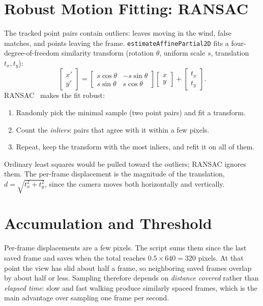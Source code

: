 \documentclass[11pt]{article}
\begin{document}
\section{Robust Motion Fitting: RANSAC}
The tracked point pairs contain outliers: leaves moving in the wind, false
matches, and points leaving the frame. \texttt{estimateAffinePartial2D} fits a
four-degree-of-freedom similarity transform (rotation $\theta$, uniform scale
$s$, translation $t_x,t_y$):
\begin{equation}
\begin{bmatrix} x' \\ y' \end{bmatrix} =
\begin{bmatrix} s\cos\theta & -s\sin\theta \\ s\sin\theta & s\cos\theta \end{bmatrix}
\begin{bmatrix} x \\ y \end{bmatrix} +
\begin{bmatrix} t_x \\ t_y \end{bmatrix}.
\end{equation}
RANSAC~\cite{fischler1981} makes the fit robust:
\begin{enumerate}
  \item Randomly pick the minimal sample (two point pairs) and fit a transform.
  \item Count the \emph{inliers}: pairs that agree with it within a few pixels.
  \item Repeat, keep the transform with the most inliers, and refit it on all of them.
\end{enumerate}
Ordinary least squares would be pulled toward the outliers; RANSAC ignores
them. The per-frame displacement is the magnitude of the translation,
$d = \sqrt{t_x^2 + t_y^2}$, since the camera moves both horizontally and
vertically.

\section{Accumulation and Threshold}
Per-frame displacements are a few pixels. The script sums them since the last
saved frame and saves when the total reaches
$0.5 \times 640 = 320$ pixels. At that point the view has slid about half a
frame, so neighboring saved frames overlap by about half or less. Sampling therefore depends on \emph{distance covered} rather than
\emph{elapsed time}: slow and fast walking produce similarly spaced frames,
which is the main advantage over sampling one frame per second.
\end{document}
